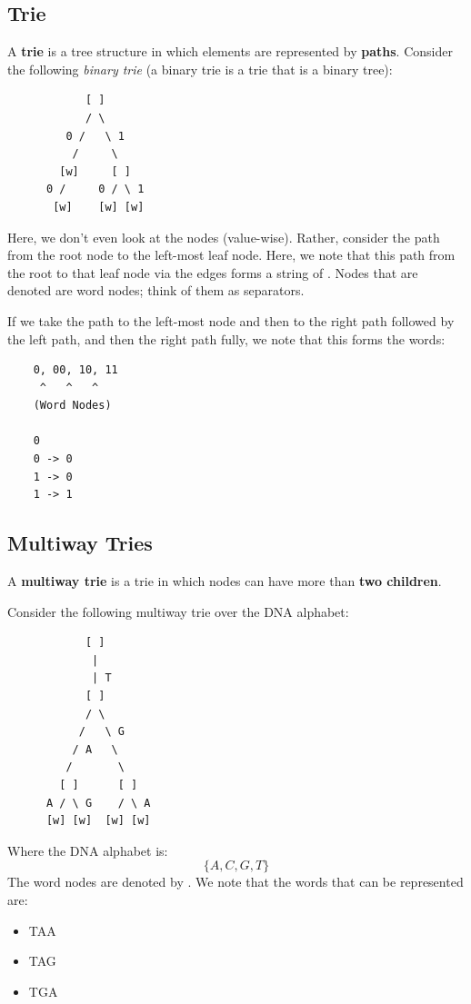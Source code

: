 \documentclass[letterpaper]{article}
\begin{document}
\subsection{Trie}
A \textbf{trie} is a tree structure in which elements are represented by \textbf{paths}. Consider the following \emph{binary trie} (a binary trie is a trie that is a binary tree):
\begin{verbatim}
            [ ]
            / \ 
         0 /   \ 1
          /     \ 
        [w]     [ ]
      0 /     0 / \ 1 
       [w]    [w] [w]
\end{verbatim}
Here, we don't even look at the nodes (value-wise). Rather, consider the path from the root node to the left-most leaf node. Here, we note that this path from the root to that leaf node via the edges forms a string of . Nodes that are denoted \code{[w]} are word nodes; think of them as separators. 

\bigskip

If we take the path to the left-most node and then to the right path followed by the left path, and then the right path fully, we note that this forms the words:  
\begin{verbatim}
    0, 00, 10, 11
     ^   ^   ^ 
    (Word Nodes)

    0 
    0 -> 0 
    1 -> 0
    1 -> 1
\end{verbatim}


\subsection{Multiway Tries}
A \textbf{multiway trie} is a trie in which nodes can have more than \textbf{two children}. 

\bigskip 

Consider the following multiway trie over the DNA alphabet:
\begin{verbatim}
            [ ]
             |
             | T
            [ ]
            / \ 
           /   \ G 
          / A   \ 
         /       \ 
        [ ]      [ ]
      A / \ G    / \ A
      [w] [w]  [w] [w]
\end{verbatim}
Where the DNA alphabet is: 
\[\{A, C, G, T\}\]
The word nodes are denoted by \code{[w]}. We note that the words that can be represented are: 
\begin{itemize}
    \item TAA 
    \item TAG 
    \item TGA 
\end{itemize}
\end{document}
